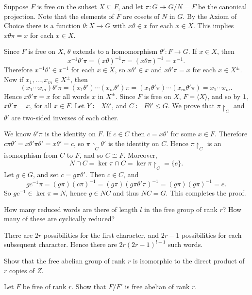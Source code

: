 \begin{questions}
  \begin{solution}
    Suppose $F$ is free on the subset $X\subseteq F$, and let $\pi\colon G\twoheadrightarrow G/N=F$ be the canonical projection. Note that the elements of $F$ are cosets of $N$ in $G$. By the Axiom of Choice there is a function $\theta\colon X\to G$ with $x\theta\in x$ for each $x\in X$. This implies $x\theta\pi=x$ for each $x\in X$.

    Since $F$ is free on $X$, $\theta$ extends to a homomorphism $\theta'\colon F\to G$. If $x\in X$, then
    \[ x^{-1}\theta'\pi = (x\theta)^{-1}\pi = (x\theta\pi)^{-1} = x^{-1}. \]
    Therefore $x^{-1}\theta'\in x^{-1}$ for each $x\in X$, so $x\theta'\in x$ and $x\theta'\pi=x$ for each $x\in X^\pm$. Now if $x_1,\ldots,x_m\in X^\pm$, then
    \[ (x_1\cdots x_m)\theta'\pi = (x_1\theta')\cdots(x_m\theta')\pi = (x_1\theta'\pi)\cdots(x_m\theta'\pi) = x_1\cdots x_m. \]
    Hence $x\theta'\pi=x$ for all words $x$ in $X^\pm$. Since $F$ is free on $X$, $F=\langle X \rangle$, and so by \textbf{1}, $x\theta'\pi=x$, for all $x\in F$. Let $Y\coloneqq X\theta'$, and $C\coloneqq F\theta'\leq G$. We prove that $\pi{\restriction_C}$ and $\theta'$ are two-sided inverses of each other.

    We know $\theta'\pi$ is the identity on $F$. If $c\in C$ then $c=x\theta'$ for some $x\in F$. Therefore $c\pi\theta'=x\theta'\pi\theta'=x\theta'=c$, so $\pi{\restriction_C}\theta'$ is the identity on $C$. Hence $\pi{\restriction_C}$ is an isomorphism from $C$ to $F$, and so $C\cong F$. Moreover,
    \[ N\cap C = \ker\pi\cap C = \ker\pi{\restriction_C}=\{e\}. \]
    Let $g\in G$, and set $c=g\pi\theta'$. Then $c\in C$, and
    \[ gc^{-1}\pi=(g\pi)(c\pi)^{-1}=(g\pi)(g\pi\theta'\pi)^{-1}=(g\pi)(g\pi)^{-1}=e. \]
    So $gc^{-1}\in\ker\pi=N$, hence $g\in NC$ and thus $NC=G$. This completes the proof.
  \end{solution}

\question How many reduced words are there of length $l$ in the free group of rank $r$? How many of these are cyclically reduced?
  \begin{solution}
    There are $2r$ possibilities for the first character, and $2r-1$ possibilities for each subsequent character. Hence there are $2r(2r-1)^{l-1}$ such words.
  \end{solution}

\question Show that the free abelian group of rank $r$ is isomorphic to the direct product of $r$ copies of $Z$.

\question Let $F$ be free of rank $r$. Show that $F/F'$ is free abelian of rank $r$.


\end{questions}
